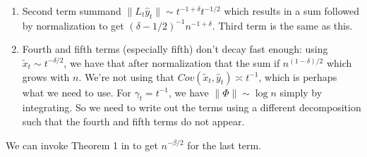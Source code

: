 \begin{enumerate}
    \item Second term summand $\lVert L_t \hat{y}_t \rVert \sim t^{-1 + \delta} t^{-1/2}$ which results in a sum followed by normalization to get $(\delta - 1/2)^{-1} n^{-1 + \delta}$.
    Third term is the same as this.
    \item Fourth and fifth terms (especially fifth) don't decay fast enough: using $\tilde{x}_t \sim t^{-\delta/2}$, we have that after normalization that the sum if $n^{(1 - \delta)/2}$ which grows with $n$. 
    We're not using that $Cov(\tilde{x}_t, \hat{y}_t) \asymp t^{-1}$, which is perhaps what we need to use. 
    {\color{blue}For $\gamma_t = t^{-1}$, we have $\lVert \Phi \rVert \sim \log n$ simply by integrating. 
    So we need to write out the terms using a different decomposition such that the fourth and fifth terms do not appear. 
    } 
\end{enumerate}
We can invoke Theorem 1 in \citep{srikant2024CLT} to get $n^{-\beta / 2}$ for the last term.



